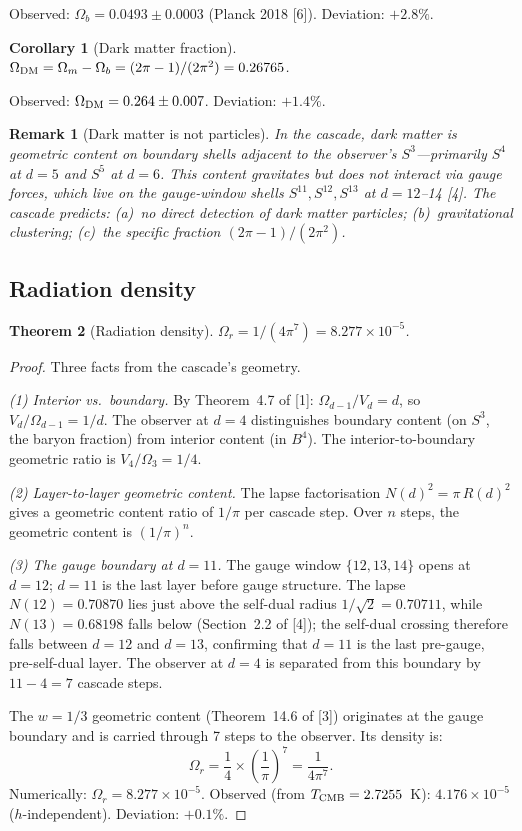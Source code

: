\documentclass[12pt,a4paper]{article}
\newtheorem{theorem}{Theorem}[section]
\newtheorem{corollary}[theorem]{Corollary}
\newtheorem*{remark}{Remark}
\begin{document}
Observed: $\Omega_b = 0.0493 \pm 0.0003$ (Planck 2018 [6]). Deviation: $+2.8\%$.

\begin{corollary}[Dark matter fraction]
$\Omega_{\rm DM} = \Omega_m - \Omega_b = (2\pi-1)/(2\pi^2) = 0.26765$.
\end{corollary}

Observed: $\Omega_{\rm DM} = 0.264 \pm 0.007$. Deviation: $+1.4\%$.

\begin{remark}[Dark matter is not particles]
In the cascade, dark matter is geometric content on boundary shells adjacent to the
observer's $S^3$---primarily $S^4$ at $d = 5$ and $S^5$ at $d = 6$. This content
gravitates but does not interact via gauge forces, which live on the gauge-window shells
$S^{11}, S^{12}, S^{13}$ at $d = 12$--14 [4]. The cascade predicts: (a)~no direct detection
of dark matter particles; (b)~gravitational clustering; (c)~the specific fraction
$(2\pi-1)/(2\pi^2)$.
\end{remark}

\subsection{Radiation density}

\begin{theorem}[Radiation density]\label{thm:omega_r}
$\Omega_r = 1/(4\pi^7) = 8.277 \times 10^{-5}$.
\end{theorem}

\begin{proof}
Three facts from the cascade's geometry.

\emph{(1) Interior vs.\ boundary.} By Theorem~4.7 of [1]: $\Omega_{d-1}/V_d = d$, so
$V_d/\Omega_{d-1} = 1/d$. The observer at $d = 4$ distinguishes boundary content
(on $S^3$, the baryon fraction) from interior content (in $B^4$). The interior-to-boundary
geometric ratio is $V_4/\Omega_3 = 1/4$.

\emph{(2) Layer-to-layer geometric content.} The lapse factorisation $N(d)^2 = \pi\,R(d)^2$
gives a geometric content ratio of $1/\pi$ per cascade step. Over $n$ steps, the geometric
content is $(1/\pi)^n$.

\emph{(3) The gauge boundary at $d = 11$.} The gauge window $\{12,13,14\}$ opens at
$d = 12$; $d = 11$ is the last layer before gauge structure. The lapse $N(12) = 0.70870$
lies just above the self-dual radius $1/\sqrt{2} = 0.70711$, while $N(13) = 0.68198$
falls below (Section~2.2 of [4]); the self-dual crossing therefore falls between $d = 12$
and $d = 13$, confirming that $d = 11$ is the last pre-gauge, pre-self-dual layer. The
observer at $d = 4$ is separated from this boundary by $11 - 4 = 7$ cascade steps.

The $w = 1/3$ geometric content (Theorem~14.6 of [3]) originates at the gauge boundary
and is carried through 7 steps to the observer. Its density is:
\[
\Omega_r = \frac{1}{4} \times \left(\frac{1}{\pi}\right)^7 = \frac{1}{4\pi^7}.
\]
Numerically: $\Omega_r = 8.277 \times 10^{-5}$.
Observed (from $T_{\rm CMB} = 2.7255$~K): $4.176 \times 10^{-5}$ ($h$-independent).
Deviation: $+0.1\%$.
\end{proof}
\end{document}
